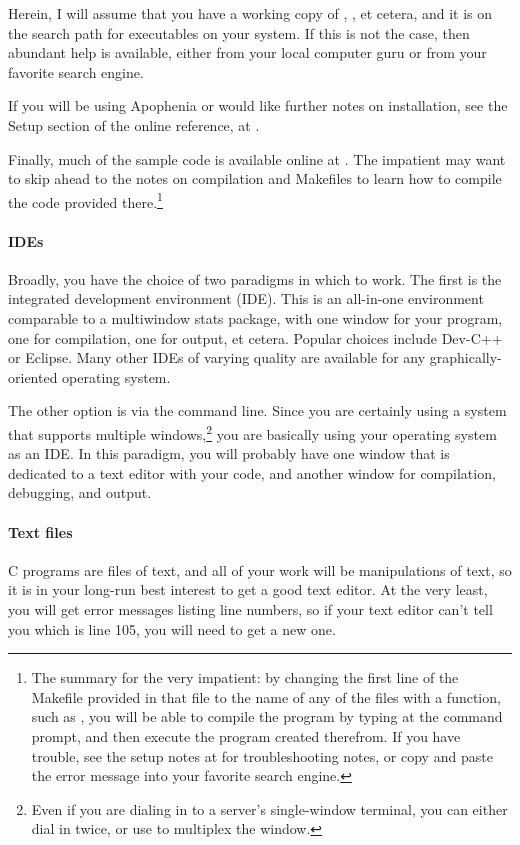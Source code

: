 \documentclass[12pt]{article}
\def\ind#1{\index{#1}#1}
\begin{document}
Herein, I will assume that you have a working copy of ,
, et cetera, and it is on the search path for executables
on your system. If this is not the case, then abundant help is available,
either from your local computer guru or from your favorite search engine.

If you will be using Apophenia or would like further notes on
installation, see the Setup section of the online reference, at
\onlinereflocation.

Finally, much of the sample code is available online at
\samplecodelocation. The impatient may want to skip ahead to the notes on
compilation and Makefiles to learn how to compile the code provided 
there.\footnote{The summary for the very impatient: by changing the
first line of the Makefile provided in that file to the name of any of the files with
a  function, such as , you will be
able to compile the program by typing  at the command
prompt, and then execute the program created therefrom. If you have
trouble, see the setup notes at \onlinereflocation{} for troubleshooting
notes, or copy and paste the error message into your favorite search
engine.}

\paragraph{IDEs}  
Broadly, you have the choice of two paradigms in which to work. The
first is the integrated development environment (IDE). This is an
all-in-one environment comparable to a multiwindow stats package, with
one window for your program, one for compilation, one for output, et
cetera.  
Popular choices include Dev-C++ or Eclipse. Many other IDEs of varying
quality are available for any graphically-oriented operating system.

The other option is via the command line. Since you are certainly using
a system that supports multiple windows,\footnote{Even if you are
dialing in to a server's single-window terminal, you can either dial in
twice, or use  to multiplex the window.} 
you are basically using your operating system as an IDE.
In this paradigm, you will probably have one window that is dedicated to
a text editor with your code, and another window for compilation,
debugging, and output.



\paragraph{Text files} C programs are files of text, and all of your work
will be manipulations of text, so it is in your long-run best interest to
get a good \ind{text editor}. At the very least, you will get error messages
listing line numbers, so if your text editor can't tell you which is
line 105, you will need to get a new one.
\end{document}
